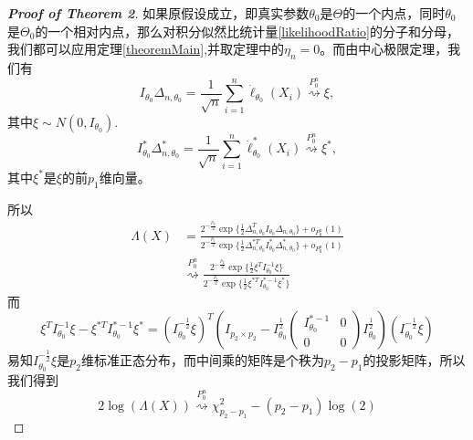 \documentclass[review]{elsarticle}
\begin{document}
\begin{proof}[\textbf{Proof of Theorem 2}]
    如果原假设成立，即真实参数$\theta_0$是$\Theta$的一个内点，同时$\theta_0$是$\Theta_0$的一个相对内点，那么对积分似然比统计量\eqref{likelihoodRatio}的分子和分母，我们都可以应用定理\ref{theoremMain},并取定理中的$\eta_n=0$。而由中心极限定理，我们有
\begin{equation}
    I_{\theta_0}\Delta_{n,\theta_0}=\frac{1}{\sqrt{n}}\sum^n_{i=1}\dot{\ell}_{\theta_0}(X_i)\overset{P_0^n}{\rightsquigarrow }\xi, 
\end{equation}
其中$\xi\sim N(0,I_{\theta_0})$.
\begin{equation}
    I^*_{\theta_0}\Delta^*_{n,\theta_0}=\frac{1}{\sqrt{n}}\sum^n_{i=1}\dot{\ell}^*_{\theta_0}(X_i)\overset{P_0^n}{\rightsquigarrow} \xi^*, 
\end{equation}
其中$\xi^*$是$\xi$的前$p_1$维向量。

所以
\begin{equation}\label{equationNull}
    \begin{aligned} 
        \Lambda(X)&=
        \frac{
            2^{-\frac{p_2}{2}}\exp\{\frac{1}{2}\Delta_{n,\theta_0}^TI_{\theta_0}\Delta_{n,\theta_0}\}+o_{P_0^n}(1)
        }{
            2^{-\frac{p_1}{2}}\exp\{\frac{1}{2}\Delta_{n,\theta_0}^{*T}I^*_{\theta_0}\Delta^*_{n,\theta_0}\}+o_{P_0^n}(1)
        }
        \\
        &\overset{P_{0}^n}{\rightsquigarrow }
        \frac{
            2^{-\frac{p_2}{2}}\exp\{\frac{1}{2}\xi^TI^{-1}_{\theta_0}\xi\}
        }{
            2^{-\frac{p_1}{2}}\exp\{\frac{1}{2}\xi^{*T}I^{*-1}_{\theta_0}\xi^*\}
        }
    \end{aligned}
\end{equation}
而
\begin{equation}\label{equationXi}
    \xi^TI^{-1}_{\theta_0}\xi -\xi^{*T}I^{*-1}_{\theta_0}\xi^*
    =(I_{\theta_0}^{-\frac{1}{2}}\xi)^T(
        I_{p_{2}\times p_{2}}-
        I_{\theta_0}^{\frac{1}{2}}
        \left(\begin{matrix} 
                I^{*-1}_{\theta_0}&0\\
                0&0
        \end{matrix}\right)
        I_{\theta_0}^{\frac{1}{2}}
    )(I_{\theta_0}^{-\frac{1}{2}}\xi)
\end{equation}
易知$I_{\theta_0}^{-\frac{1}{2}}\xi$是$p_2$维标准正态分布，而中间乘的矩阵是个秩为$p_2-p_1$的投影矩阵，所以我们得到
\begin{equation}
    2\log(\Lambda(X))\overset{P_0^n}{\rightsquigarrow} \chi^2_{p_2-p_1}-(p_2-p_1)\log(2)
\end{equation}
\end{proof}
\end{document}

